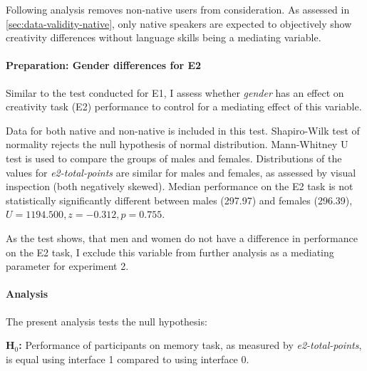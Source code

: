 	Following analysis removes non-native users from consideration. As assessed in \ref{sec:data-validity-native}, only native speakers are expected to objectively show creativity differences without language skills being a mediating variable.

	
	\paragraph{Preparation: Gender differences for E2}
	
	Similar to the test conducted for E1, I assess whether \textit{gender} has an effect on creativity task (E2) performance to control for a mediating effect of this variable.
	
	Data for both native and non-native is included in this test.
	Shapiro-Wilk test of normality rejects the null hypothesis of normal distribution. 
	Mann-Whitney U test is used to compare the groups of males and females. 
	Distributions of the values for \textit{e2-total-points} are similar for males and females, as assessed by visual inspection (both negatively skewed). 
	Median performance on the E2 task is not statistically significantly different between males (297.97) and females (296.39), $ U = 1194.500, z = -0.312, p = 0.755 $. 
	
	As the test shows, that men and women do not have a difference in performance on the E2 task, I exclude this variable from further analysis as a mediating parameter for experiment 2.
	
	\paragraph{Analysis}
	
	The present analysis tests the null hypothesis:
	
	\textbf{H$_{0}$:} Performance of participants on memory task, as measured by \textit{e2-total-points}, is equal using interface 1 compared to using interface 0.
	
